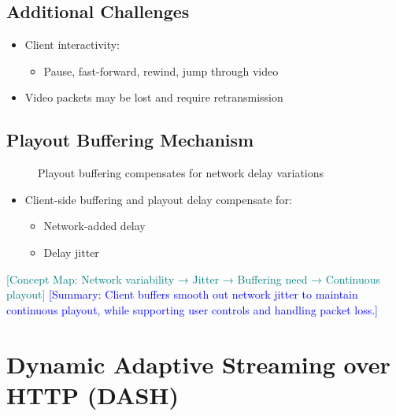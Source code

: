 \documentclass[12pt]{article}
\begin{document}
\subsection{Additional Challenges}
\begin{itemize}
    \item Client interactivity:
          \begin{itemize}
              \item Pause, fast-forward, rewind, jump through video
          \end{itemize}
    \item Video packets may be lost and require retransmission
\end{itemize}

\subsection{Playout Buffering Mechanism}
\begin{figure}[h]
    \centering
    \caption{Playout buffering compensates for network delay variations}
\end{figure}

\begin{itemize}
    \item Client-side buffering and playout delay compensate for:
          \begin{itemize}
              \item Network-added delay
              \item Delay jitter
          \end{itemize}
\end{itemize}

\textcolor{teal}{[Concept Map: Network variability → Jitter → Buffering need → Continuous playout]}
\textcolor{blue}{[Summary: Client buffers smooth out network jitter to maintain continuous playout, while supporting user controls and handling packet loss.]}

\section{Dynamic Adaptive Streaming over HTTP (DASH)}
\end{document}
